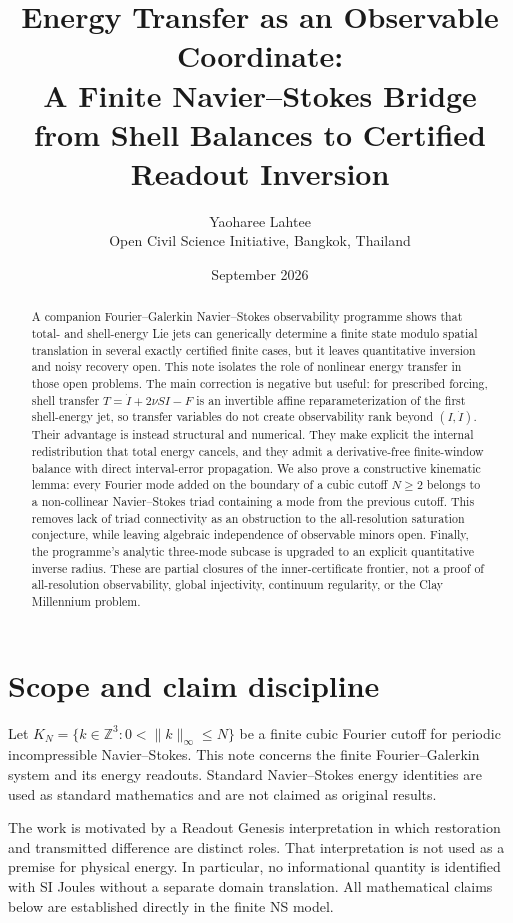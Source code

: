 \documentclass[11pt]{article}
\title{Energy Transfer as an Observable Coordinate:\\
A Finite Navier--Stokes Bridge from Shell Balances to Certified Readout Inversion}
\author{Yaoharee Lahtee\\\small Open Civil Science Initiative, Bangkok, Thailand}
\date{September 2026}
\theoremstyle{definition}
\begin{document}
\maketitle

\begin{abstract}
A companion Fourier--Galerkin Navier--Stokes observability programme shows that total- and
shell-energy Lie jets can generically determine a finite state modulo spatial translation in
several exactly certified finite cases, but it leaves quantitative inversion and noisy recovery
open.  This note isolates the role of nonlinear energy transfer in those open problems.  The
main correction is negative but useful: for prescribed forcing, shell transfer
$T=\dot I+2\nu S I-F$ is an invertible affine reparameterization of the first shell-energy jet,
so transfer variables do not create observability rank beyond $(I,\dot I)$.  Their advantage is
instead structural and numerical.  They make explicit the internal redistribution that total
energy cancels, and they admit a derivative-free finite-window balance with direct interval-error
propagation.  We also prove a constructive kinematic lemma: every Fourier mode added on the
boundary of a cubic cutoff $N\ge2$ belongs to a non-collinear Navier--Stokes triad containing a
mode from the previous cutoff.  This removes lack of triad connectivity as an obstruction to the
all-resolution saturation conjecture, while leaving algebraic independence of observable minors
open.  Finally, the programme's analytic three-mode subcase is upgraded to an explicit
quantitative inverse radius.  These are partial closures of the inner-certificate frontier, not a
proof of all-resolution observability, global injectivity, continuum regularity, or the Clay
Millennium problem.
\end{abstract}

\section{Scope and claim discipline}

Let $K_N=\{k\in\mathbb Z^3:0<\|k\|_\infty\le N\}$ be a finite cubic Fourier cutoff for periodic
incompressible Navier--Stokes.  This note concerns the finite Fourier--Galerkin system and its
energy readouts.  Standard Navier--Stokes energy identities are used as standard mathematics and
are not claimed as original results.

The work is motivated by a Readout Genesis interpretation in which restoration and transmitted
difference are distinct roles.  That interpretation is not used as a premise for physical energy.
In particular, no informational quantity is identified with SI Joules without a separate domain
translation.  All mathematical claims below are established directly in the finite NS model.
\end{document}
